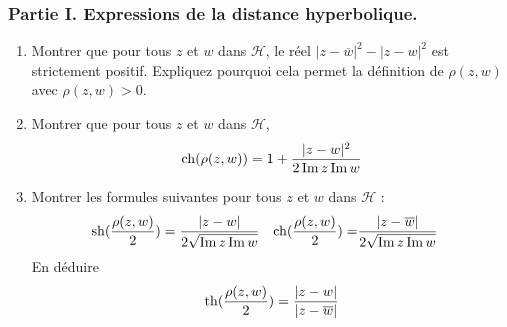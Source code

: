 \subsubsection*{Partie I. Expressions de la distance hyperbolique.}
\begin{enumerate}
 \item Montrer que pour tous $z$ et $w$ dans $\mathcal H$, le réel $|z-\overline{w}|^2-|z-w|^2$ est strictement positif. Expliquez pourquoi cela permet la définition de $\rho(z,w)$ avec $\rho(z,w)>0$.
\item Montrer que pour tous $z$ et $w$ dans $\mathcal H$,
\begin{displaymath}
 \operatorname{ch}(\rho(z,w)) = 1 + \dfrac{|z-w|^2}{2\operatorname{Im} z \operatorname{Im} w}
\end{displaymath}
\item Montrer les formules suivantes pour tous $z$ et $w$ dans $\mathcal H$ :
\begin{align*}
 \operatorname{sh}(\dfrac{\rho(z,w)}{2}) = \dfrac{|z-w|}{2\sqrt{\operatorname{Im} z \operatorname{Im} w}}  & &
 \operatorname{ch}(\dfrac{\rho(z,w)}{2}) =& \dfrac{|z-\overline{w}|}{2\sqrt{\operatorname{Im} z \operatorname{Im} w}}
\end{align*}
En déduire
\begin{displaymath}
 \operatorname{th}(\dfrac{\rho(z,w)}{2}) = \dfrac{|z-w|}{|z-\overline{w}|} 
\end{displaymath}
\end{enumerate}

